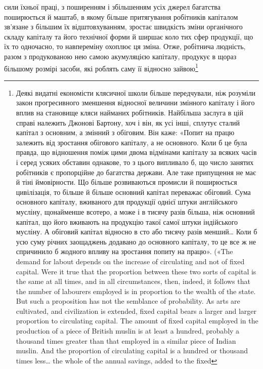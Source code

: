 \parcont{}  %
сили їхньої праці, з поширенням і збільшенням усіх
джерел багатства поширюється й маштаб, в якому більше притягування
робітників капіталом зв’язане з більшим їх відштовхуванням,
зростає швидкість зміни органічного складу капіталу
та його технічної форми й ширшає коло тих сфер продукції, що
їх то одночасно, то навпереміну охоплює ця зміна. Отже, робітнича
людність, разом з продукованою нею самою акумуляцією
капіталу, продукує в щораз більшому розмірі засоби, які роблять
саму її відносно зайвою\footnote{
Деякі видатні економісти клясичної школи більше передчували,
ніж розуміли закон прогресивного зменшення відносної величини змінного
капіталу і його вплив на становище кляси найманих робітників.
Найбільша заслуга в цій справі належить Джонові Бартону, хоч і він, як
усі інші, сплутує сталий капітал з основним, а змінний з обіговим. Він
каже: «Попит на працю залежить від зростання обігового капіталу, а
не основного. Коли б це була правда, що відношення поміж цими двома
відмінами капіталу за всяких часів і серед усяких обставин однакове,
то з цього випливало б, що число занятих робітників є пропорційне до
багатства держави. Але таке припущення не має й тіні ймовірности. Що
більше розвиваються промисли й поширюється цивілізація, то більше
й більше основний капітал переважає обіговий. Сума основного капіталу,
вживаного для продукції однієї штуки англійського мусліну, щонайменше
всотеро, а може і в тисячу разів більша, ніж основний капітал, що його
вживають на продукцію такої самої штуки індійського мусліну. А обіговий
капітал відносно в сто або тисячу разів менший\dots{} Коли б усю суму річних
заощаджень додавано до основного капіталу, то це все ж не спричинило
б жодного впливу на зростання попиту на працю». («The demand for
labout depends on the increase of circulating and not of fixed capital. Were
it true that the proportion between these two sorts of capital is the same at
all times, and in all circumstances, then, indeed, it follows that the number
of labourers employed is in proportion to the wealth of the state.
But such a proposition has not the semblance of probability. As arts are
cultivated, and civilization is extended, fixed capital bears a larger and
larger proportion to circulating capital. The amount of fixed capital employed
in the production of a piece of British muslin is at least a hundred, probably
a thousand times greater than that employed in a similar piece of
Indian muslin. And the proportion of circulating capital is a hundred or thousand times less\dots{} the whole of the annual savings, added to the fixed
}

